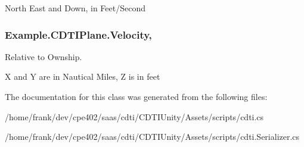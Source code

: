 North East and Down, in Feet/\+Second

\hypertarget{class_example_1_1_c_d_t_i_plane_a52e1d4c9df3e1b3b5f281bbac9e49269}{}
\subsubsection[{Velocity}]{ Example.\+C\+D\+T\+I\+Plane.\+Velocity\hspace{0.3cm}{\ttfamily [get]}, {\ttfamily [set]}}\label{class_example_1_1_c_d_t_i_plane_a52e1d4c9df3e1b3b5f281bbac9e49269}




Relative to Ownship.

X and Y are in Nautical Miles, Z is in feet

The documentation for this class was generated from the following files\+:\begin{DoxyCompactItemize}
\item 
/home/frank/dev/cpe402/saas/cdti/\+C\+D\+T\+I\+Unity/\+Assets/scripts/cdti.\+cs\item 
/home/frank/dev/cpe402/saas/cdti/\+C\+D\+T\+I\+Unity/\+Assets/scripts/cdti.\+Serializer.\+cs\end{DoxyCompactItemize}
